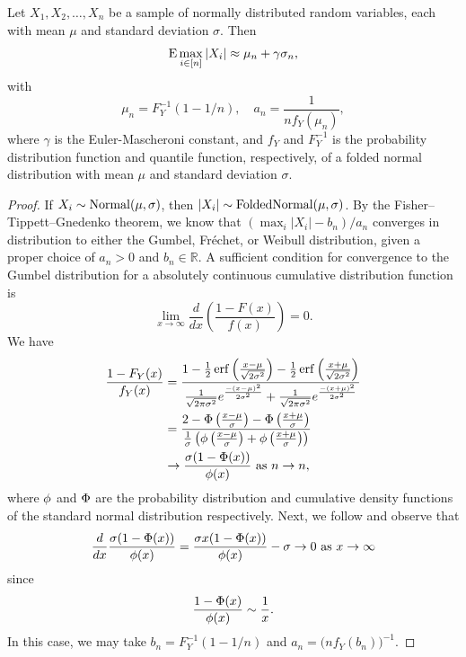\begin{theorem}
  \label{thm:maxabs-gev}
  Let \(X_1, X_2, \dots, X_n\) be a sample of normally distributed random variables, each with mean \(\mu\) and standard deviation \(\sigma\). Then
  \[
    \operatorname{E} \max_{i \in [n]} |X_i| \approx \mu_n + \gamma \sigma_n,
  \]
  with
  \[
    \mu_n = F_Y^{-1}(1 - 1/n), \quad a_n = \frac{1}{n f_Y(\mu_n)},
  \]
  where \(\gamma\) is the Euler-Mascheroni constant, and \(f_Y\) and \(F_Y^{-1}\) is the probability distribution function and quantile function, respectively, of a folded normal distribution with mean \(\mu\) and standard deviation \(\sigma\).
\end{theorem}
\begin{proof}
  If \(X_i \sim \operatorname{Normal}(\mu, \sigma)\), then \(|X_i| \sim \operatorname{FoldedNormal}(\mu,\sigma)\). By the Fisher--Tippett--Gnedenko theorem, we know that \((\max_i |X_i| - b_n) / a_n\) converges in distribution to either the Gumbel, Fréchet, or Weibull distribution, given a proper choice of \(a_n > 0\) and \(b_n \in \mathbb{R}\). A sufficient condition for convergence to the Gumbel distribution for a absolutely continuous cumulative distribution function~\parencite[Theorem 10.5.2]{nagaraja2003} is
  \[
    \lim_{x \rightarrow \infty} \frac{d}{dx}\left(\frac{1- F(x)}{f(x)}\right) = 0.
  \]
  We have
  \[
    \begin{aligned}
      \frac{1 - F_Y(x)}{f_Y(x)} & = \frac{1 - \frac{1}{2}\operatorname{erf}{\left(\frac{x - \mu}{\sqrt{2\sigma^2}}\right)} - \frac{1}{2}\operatorname{erf}{\left(\frac{x + \mu}{\sqrt{2\sigma^2}}\right)}}{\frac{1}{\sqrt{2\pi\sigma^2}}e^{\frac{-(x-\mu)^2}{2\sigma^2}} + \frac{1}{\sqrt{2\pi\sigma^2}}e^{\frac{-(x+\mu)^2}{2\sigma^2}}} \\
                                & = \frac{2 - \operatorname{\Phi}\left(\frac{x - \mu}{\sigma}\right) - \operatorname{\Phi}\left(\frac{x + \mu}{\sigma}\right)}{\frac{1}{\sigma}\left(\operatorname{\phi}\left(\frac{x - \mu}{\sigma}\right) + \operatorname{\phi}\left(\frac{x + \mu}{\sigma}\right)\right)}                                                              \\
                                & \rightarrow \frac{\sigma(1 - \operatorname{\Phi}(x))}{\operatorname{\phi}(x)} \text{ as } n \rightarrow n,
    \end{aligned}
  \]
  where \(\operatorname{\phi}\) and \(\operatorname{\Phi}\) are the probability distribution and cumulative density functions of the standard normal distribution respectively.
  Next, we follow \textcite[example 10.5.3]{nagaraja2003} and observe that
  \[
    \frac{d}{dx} \frac{\sigma(1 - \operatorname{\Phi}(x))}{\operatorname{\phi}(x)} = \frac{\sigma x (1 - \operatorname{\Phi}(x))}{\operatorname{\phi}(x)} - \sigma \rightarrow 0 \text{ as } x \rightarrow \infty
  \]
  since
  \[
    \frac{1 - \operatorname{\Phi}(x)}{\operatorname{\phi}(x)} \sim \frac{1}{x}.
  \]
  In this case, we may take \(b_n = F_Y^{-1}(1 - 1/n)\) and \(a_n = \big(n f_Y(b_n)\big)^{-1}\).
\end{proof}

